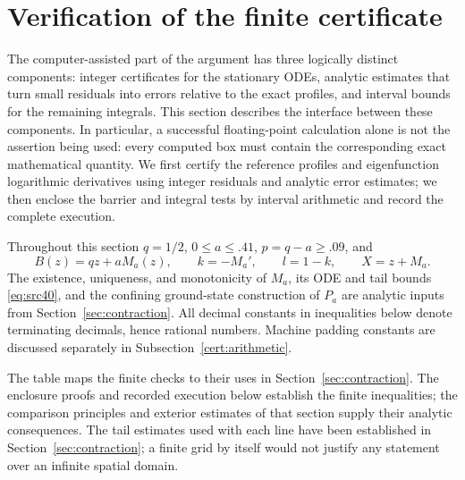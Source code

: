 \documentclass[11pt,a4paper]{article}
\numberwithin{equation}{section}
\theoremstyle{definition}
\theoremstyle{remark}
\begin{document}
\section{Verification of the finite certificate}\label{sec:certificate}

The computer-assisted part of the argument has three logically distinct
components: integer certificates for the stationary ODEs, analytic estimates
that turn small residuals into errors relative to the exact profiles, and
interval bounds for the remaining integrals.  This section describes the
interface between these components.  In particular, a successful floating-point
calculation alone is not the assertion being used: every computed box must
contain the corresponding exact mathematical quantity.
We first certify the reference profiles and eigenfunction logarithmic
derivatives using integer residuals and analytic error estimates; we then
enclose the barrier and integral tests by interval arithmetic and record
the complete execution.

Throughout this section $q=1/2$, $0\le a\le .41$, $p=q-a\ge .09$, and
\[
 B(z)=qz+aM_a(z),\qquad k=-M_a',\qquad l=1-k,\qquad X=z+M_a.
\]
The existence, uniqueness, and monotonicity of $M_a$, its ODE and tail bounds
\eqref{eq:src40}, and the confining ground-state construction of $P_a$ are
analytic inputs from Section~\ref{sec:contraction}.  All decimal constants in
inequalities below denote terminating decimals, hence rational numbers.
Machine padding constants are discussed separately in
Subsection~\ref{cert:arithmetic}.

The table maps the finite checks to their uses in
Section~\ref{sec:contraction}. The enclosure proofs and recorded execution
below establish the finite inequalities; the comparison principles and
exterior estimates of that section supply their analytic consequences.
The tail estimates used with each line have been established in
Section~\ref{sec:contraction}; a finite grid by itself would not justify
any statement over an infinite spatial domain.
\end{document}

